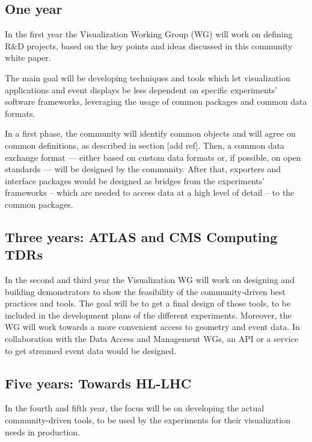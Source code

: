 \documentclass[12pt,a4paper]{article}
\begin{document}
\hypertarget{one-year}{%
\subsection{One year}\label{one-year}}

In the first year the Visualization Working Group (WG) will work on defining R{\&}D projects, based on the key
points and ideas discussed in this community white paper.

The main goal will be developing techniques and tools which let visualization applications and event displays be
less dependent on specific experiments’ software frameworks, leveraging the usage of common packages and common data formats.

In a first phase, the community will identify common objects and will agree on common definitions, as described in
section [add ref]. Then, a common data exchange format --- either based on custom data formats or, if possible, on
open standards --- will be designed by the community. After that, exporters and interface packages would be designed
as bridges from the experiments’ frameworks -- which are needed to access data at a high level of detail -- to the common packages.

\hypertarget{three-year}{%
\subsection{Three years: ATLAS and CMS Computing TDRs}\label{three-year}}

In the second and third year the Visualization WG will work on designing and building demonstrators to show the feasibility of
the community-driven best practices and tools. The goal will be to get a final design of those tools, to be included in the development
plans of the different experiments. Moreover, the WG will work towards a more convenient access to geometry and event data.
In collaboration with the Data Access and Management WGs, an API or a service to get streamed event data would be designed.

\hypertarget{five-year}{%
\subsection{Five years: Towards HL-LHC}\label{five-year}}

In the fourth and fifth year, the focus will be on developing the actual community-driven tools, to be used by the experiments
for their visualization needs in production.
\end{document}
